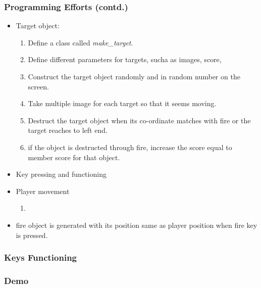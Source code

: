 \documentclass[]{beamer}
\begin{document}
\begin{frame}
  \frametitle{Programming Efforts (contd.)}
  \begin {itemize}
   \item Target object:
   \begin {enumerate}
    \item Define a class called \textit{make\_target}. %
    \item Define different parameters for targets, sucha as images,
      score,
    \item Construct the target object randomly and in random number on the screen.
    \item Take multiple image for each target so that it seems moving.
    \item Destruct the target object when its co-ordinate matches with fire
	or the target reaches to left end.
    \item if the object is destructed through fire, increase the score
	equal to member score for that object.
	
   \end {enumerate}
   
   \item Key pressing and functioning
   \item Player movement
    \begin {enumerate}
     \item 
    \end {enumerate}
    \item fire object is generated with its position same as player position
	when fire key is pressed.
    
   
  \end {itemize}


  \end{frame}
  
  

\begin{frame}
  \frametitle{Keys Functioning}

  \end{frame}

  
  
\begin{frame}
  \frametitle{Demo}

  \end{frame}

  
  
\end{document}
